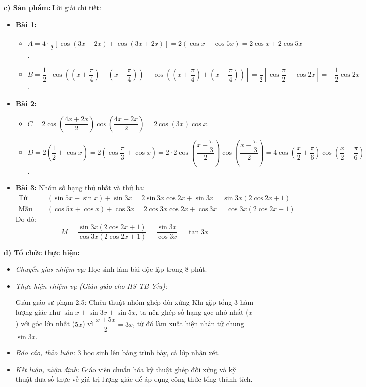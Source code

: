 \documentclass[12pt, a4paper]{article}
\begin{document}
\textbf{c) Sản phẩm:} Lời giải chi tiết:
\begin{itemize}[leftmargin=0.6cm]
    \item \textbf{Bài 1:}
    \begin{itemize}[leftmargin=0.5cm]
        \item $A = 4 \cdot \dfrac{1}{2}[\cos(3x - 2x) + \cos(3x + 2x)] = 2(\cos x + \cos 5x) = 2\cos x + 2\cos 5x$.
        \item $B = \dfrac{1}{2}\left[\cos\left(\left(x + \dfrac{\pi}{4}\right) - \left(x - \dfrac{\pi}{4}\right)\right) - \cos\left(\left(x + \dfrac{\pi}{4}\right) + \left(x - \dfrac{\pi}{4}\right)\right)\right] = \dfrac{1}{2}\left[\cos\dfrac{\pi}{2} - \cos 2x\right] = -\dfrac{1}{2}\cos 2x$.
    \end{itemize}
    \item \textbf{Bài 2:}
    \begin{itemize}[leftmargin=0.5cm]
        \item $C = 2\cos\left(\dfrac{4x + 2x}{2}\right) \cos\left(\dfrac{4x - 2x}{2}\right) = 2\cos(3x)\cos x$.
        \item $D = 2\left(\dfrac{1}{2} + \cos x\right) = 2\left(\cos\dfrac{\pi}{3} + \cos x\right) = 2 \cdot 2\cos\left(\dfrac{x + \dfrac{\pi}{3}}{2}\right) \cos\left(\dfrac{x - \dfrac{\pi}{3}}{2}\right) = 4\cos\left(\dfrac{x}{2} + \dfrac{\pi}{6}\right) \cos\left(\dfrac{x}{2} - \dfrac{\pi}{6}\right)$.
    \end{itemize}
    \item \textbf{Bài 3:}
    Nhóm số hạng thứ nhất và thứ ba:
    \begin{align*}
        \text{Tử số} &= (\sin 5x + \sin x) + \sin 3x = 2\sin 3x \cos 2x + \sin 3x = \sin 3x (2\cos 2x + 1) \\
        \text{Mẫu số} &= (\cos 5x + \cos x) + \cos 3x = 2\cos 3x \cos 2x + \cos 3x = \cos 3x (2\cos 2x + 1)
    \end{align*}
    Do đó:
    $$M = \dfrac{\sin 3x (2\cos 2x + 1)}{\cos 3x (2\cos 2x + 1)} = \dfrac{\sin 3x}{\cos 3x} = \tan 3x$$
\end{itemize}

\textbf{d) Tổ chức thực hiện:}
\begin{itemize}[leftmargin=0.6cm]
    \item \textit{Chuyển giao nhiệm vụ:} Học sinh làm bài độc lập trong 8 phút.
    \item \textit{Thực hiện nhiệm vụ (Giàn giáo cho HS TB-Yếu):}
    \begin{scaffoldbox}{Giàn giáo sư phạm 2.5: Chiến thuật nhóm ghép đối xứng}
        Khi gặp tổng 3 hàm lượng giác như $\sin x + \sin 3x + \sin 5x$, ta nên ghép số hạng góc nhỏ nhất ($x$) với góc lớn nhất ($5x$) vì $\dfrac{x + 5x}{2} = 3x$, từ đó làm xuất hiện nhân tử chung $\sin 3x$.
    \end{scaffoldbox}
    \item \textit{Báo cáo, thảo luận:} 3 học sinh lên bảng trình bày, cả lớp nhận xét.
    \item \textit{Kết luận, nhận định:} Giáo viên chuẩn hóa kỹ thuật ghép đối xứng và kỹ thuật đưa số thực về giá trị lượng giác để áp dụng công thức tổng thành tích.
\end{itemize}
\end{document}
